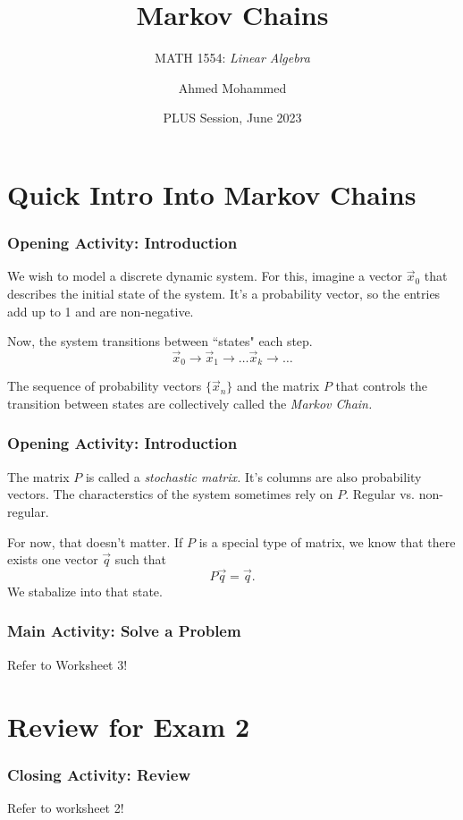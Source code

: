 \documentclass{beamer}
\title[M.C.]{Markov Chains}
\subtitle{MATH 1554: \textit{Linear Algebra}}
\author{Ahmed Mohammed}
\date{PLUS Session, June 2023}
\institute{Georgia Institute of Technology}
\begin{document}
\frame{\titlepage}

\section{Quick Intro Into Markov Chains}
\begin{frame}
	\frametitle{Opening Activity: Introduction}
	We wish to model a discrete dynamic system. For this, imagine a vector \(\vec{x}_0\) that describes the initial state of the system. It's a probability vector, so the entries
	add up to 1 and are non-negative.\pause
	
	Now, the system transitions between ``states" each step. \[\vec{x}_0 \to \vec{x}_1 \to \dots \vec{x}_k \to \dots\] \pause

	The sequence of probability vectors \(\{\vec{x}_n\}\) and the matrix \(P\) that controls the transition between states are collectively called the \textit{Markov Chain.}
\end{frame}

\begin{frame}
	\frametitle{Opening Activity: Introduction}
	The matrix \(P\) is called a \textit{stochastic matrix.} It's columns are also probability vectors. The characterstics of the system sometimes rely on \(P\). \pause
	Regular vs. non-regular. \pause

	For now, that doesn't matter. If \(P\) is a special type of matrix, we know that there exists one vector \(\vec{q}\) such that \[P\vec{q} = \vec{q}.\] \pause
	We stabalize into that state.
\end{frame}

\begin{frame}
	\frametitle{Main Activity: Solve a Problem}
	\begin{center}
		Refer to Worksheet 3!
	\end{center}

\end{frame}

\section{Review for Exam 2}
\begin{frame}
	\frametitle{Closing Activity: Review}
	\begin{center}
		Refer to worksheet 2!
	\end{center}
\end{frame}
\end{document}
